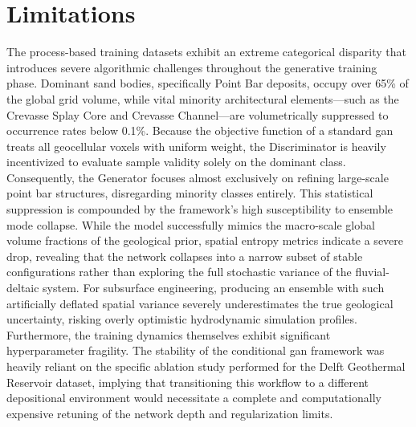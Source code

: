 \section{Limitations}\label{Sec:Limitations}
The process-based training datasets exhibit an extreme categorical disparity that introduces severe algorithmic challenges throughout the generative training phase. Dominant sand bodies, specifically Point Bar deposits, occupy over 65\% of the global grid volume, while vital minority architectural elements—such as the Crevasse Splay Core and Crevasse Channel—are volumetrically suppressed to occurrence rates below 0.1\%. Because the objective function of a standard \gls{gan} treats all geocellular voxels with uniform weight, the Discriminator is heavily incentivized to evaluate sample validity solely on the dominant class. Consequently, the Generator focuses almost exclusively on refining large-scale point bar structures, disregarding minority classes entirely. This statistical suppression is compounded by the framework's high susceptibility to ensemble mode collapse. While the model successfully mimics the macro-scale global volume fractions of the geological prior, spatial entropy metrics indicate a severe drop, revealing that the network collapses into a narrow subset of stable configurations rather than exploring the full stochastic variance of the fluvial-deltaic system. For subsurface engineering, producing an ensemble with such artificially deflated spatial variance severely underestimates the true geological uncertainty, risking overly optimistic hydrodynamic simulation profiles. Furthermore, the training dynamics themselves exhibit significant hyperparameter fragility. The stability of the conditional \gls{gan} framework was heavily reliant on the specific ablation study performed for the Delft Geothermal Reservoir dataset, implying that transitioning this workflow to a different depositional environment would necessitate a complete and computationally expensive retuning of the network depth and regularization limits.

